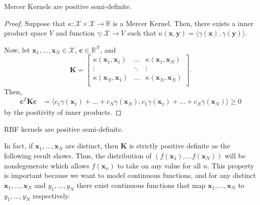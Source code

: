 \begin{lemma}
    Mercer Kernels are positive semi-definite.
\end{lemma}
\begin{proof}
    Suppose that $\kappa: \mathcal{X} \times \mathcal{X} \to \mathbb{R}$ is a Mercer Kernel.
    Then, there exists a inner product space $V$ and function $\gamma: \mathcal{X} \to V$ such that $\kappa(\mathbf{x}, \mathbf{y}) = \langle\gamma(\mathbf{x}), \gamma(\mathbf{y})\rangle$.

    Now, let $\mathbf{x}_1, \dots, \mathbf{x}_N \in \mathcal{X}$, $\mathbf{c} \in \mathbb{R}^{N}$, and
    \begin{equation*}
        \mathbf{K} =
        \begin{bmatrix}
            \kappa(\mathbf{x}_1, \mathbf{x}_1) & \dots & \kappa(\mathbf{x}_1, \mathbf{x}_N) \\
            \vdots & \ddots & \vdots \\
            \kappa(\mathbf{x}_N, \mathbf{x}_1) & \dots & \kappa(\mathbf{x}_N, \mathbf{x}_N) \\
        \end{bmatrix}
        .
    \end{equation*}
    Then,
    \begin{align*}
        \mathbf{c}^{T} \mathbf{K} \mathbf{c}
        & = \langle c_1 \gamma(\mathbf{x}_1) + \dots + c_N \gamma(\mathbf{x}_N), c_1 \gamma(\mathbf{x}_1) + \dots + c_N \gamma(\mathbf{x}_N) \rangle
        \geq 0
    \end{align*}
    by the positivity of inner products.
\end{proof}

\begin{corollary}
    \label{corr:rbf-psd}
    RBF kernels are positive semi-definite.
\end{corollary}

In fact, if $\mathbf{x}_1, \dots, \mathbf{x}_N$ are distinct, then $\mathbf{K}$ is strictly positive definite as the following result shows.
Thus, the distribution of $(f(\mathbf{x}_1), \dots f(\mathbf{x}_N))$ will be nondegenerate which allows $f(\mathbf{x}_n)$ to take on any value for all $n$.
This property is important because we want to model continuous functions, and for any distinct $\mathbf{x}_1, \dots, \mathbf{x}_N$ and $y_1, \dots, y_N$ there exist continuous functions that map $\mathbf{x}_1, \dots, \mathbf{x}_N$ to $y_1, \dots, y_N$ respectively.

